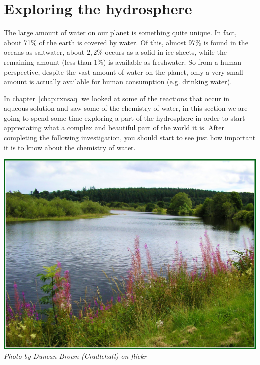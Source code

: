     \section{Exploring the hydrosphere}
            \nopagebreak

The large amount of water on our planet is something quite unique. In fact, about 71\% of the earth is covered by water. Of this, almost 97\% is found in the oceans as saltwater, about $2,2\%$ occurs as a solid in ice sheets, while the remaining amount (less than $1\%$) is available as freshwater. So from a human perspective, despite the vast amount of water on the planet, only a very small amount is actually available for human consumption (e.g. drinking water). \\
\begin{minipage}{.5\textwidth}
In chapter~\ref{chap:rxnsaq} we looked at some of the reactions that occur in aqueous solution and saw some of the chemistry of water, in this section we are going to spend some time exploring a part of the hydrosphere in order to start appreciating what a complex and beautiful part of the world it is. After completing the following investigation, you should start to see just how important it is to know about the chemistry of water.
\end{minipage}
\begin{minipage}{.5\textwidth}
\begin{center}
 \includegraphics[width=.8\textwidth]{photos/DuncanBrown(Cradlehall).jpg} \\
\textsl{Photo by Duncan Brown (Cradlehall) on flickr}
\end{center}
\end{minipage}\\
